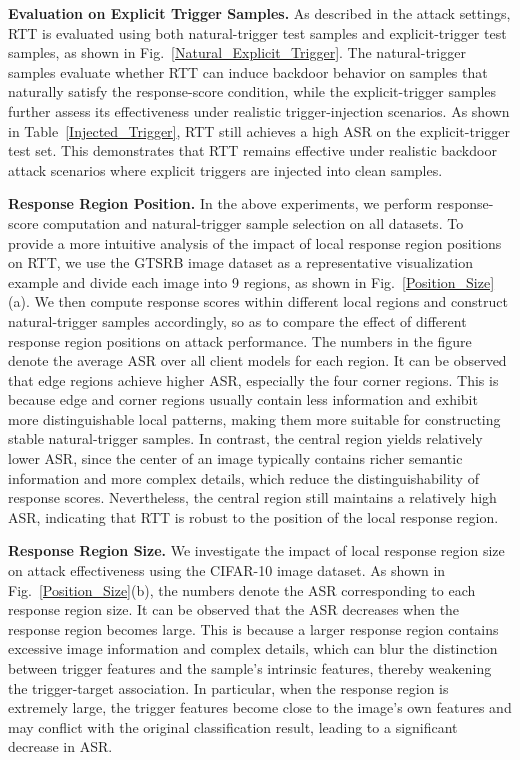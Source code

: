 \documentclass[lettersize,journal]{IEEEtran}
\begin{document}
\textbf{Evaluation on Explicit Trigger Samples.}
As described in the attack settings, RTT is evaluated using both natural-trigger test samples and explicit-trigger test samples, as shown in Fig.~\ref{Natural_Explicit_Trigger}.
The natural-trigger samples evaluate whether RTT can induce backdoor behavior on samples that naturally satisfy the response-score condition, while the explicit-trigger samples further assess its effectiveness under realistic trigger-injection scenarios.
As shown in Table~\ref{Injected_Trigger}, RTT still achieves a high ASR on the explicit-trigger test set. 
This demonstrates that RTT remains effective under realistic backdoor attack scenarios where explicit triggers are injected into clean samples.


\textbf{Response Region Position.} 
In the above experiments, we perform response-score computation and natural-trigger sample selection on all datasets.
To provide a more intuitive analysis of the impact of local response region positions on RTT, we use the GTSRB image dataset as a representative visualization example and divide each image into 9 regions, as shown in Fig.~\ref{Position_Size}(a).
We then compute response scores within different local regions and construct natural-trigger samples accordingly, so as to compare the effect of different response region positions on attack performance.
The numbers in the figure denote the average ASR over all client models for each region.
It can be observed that edge regions achieve higher ASR, especially the four corner regions.
This is because edge and corner regions usually contain less information and exhibit more distinguishable local patterns, making them more suitable for constructing stable natural-trigger samples.
In contrast, the central region yields relatively lower ASR, since the center of an image typically contains richer semantic information and more complex details, which reduce the distinguishability of response scores.
Nevertheless, the central region still maintains a relatively high ASR, indicating that RTT is robust to the position of the local response region.


\textbf{Response Region Size.} We investigate the impact of local response region size on attack effectiveness using the CIFAR-10 image dataset.
As shown in Fig.~\ref{Position_Size}(b), the numbers denote the ASR corresponding to each response region size.
It can be observed that the ASR decreases when the response region becomes large.
This is because a larger response region contains excessive image information and complex details, which can blur the distinction between trigger features and the sample’s intrinsic features, thereby weakening the trigger-target association.
In particular, when the response region is extremely large, the trigger features become close to the image’s own features and may conflict with the original classification result, leading to a significant decrease in ASR.
\end{document}
